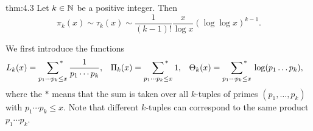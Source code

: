 \begin{theo}[Landau, 1900]{thm:4.3} 
    Let $k \in \mathbb{N}$ be a positive integer. Then 
    \[ \pi_k(x) \sim \tau_k(x) \sim \frac{1}{(k-1)!} \frac{x}{\log x} 
    (\log \log x)^{k-1}. \] 
\end{theo}
\begin{pf}
    We first introduce the functions 
    \begin{align*} 
        L_k(x) &= \sum_{p_1\cdots p_k \leq x}{\vphantom{\sum}}^{\hspace{-2.5ex}*} \hspace{1.5ex} \frac{1}{p_1 \cdots p_k}, & 
        \Pi_k(x) &= \sum_{p_1\cdots p_k \leq x}{\vphantom{\sum}}^{\hspace{-2.5ex}*} \hspace{1.5ex} 1, &
        \Theta_k(x) &= \sum_{p_1\cdots p_k \leq x}{\vphantom{\sum}}^{\hspace{-2.5ex}*} \hspace{1.5ex} \log(p_1 \dots p_k), 
    \end{align*}
    where the $*$ means that the sum is taken over all $k$-tuples of 
    primes $(p_1, \dots, p_k)$ with $p_1 \cdots p_k \leq x$. Note that 
    different $k$-tuples can correspond to the same product $p_1 \cdots p_k$. 


\end{pf}
